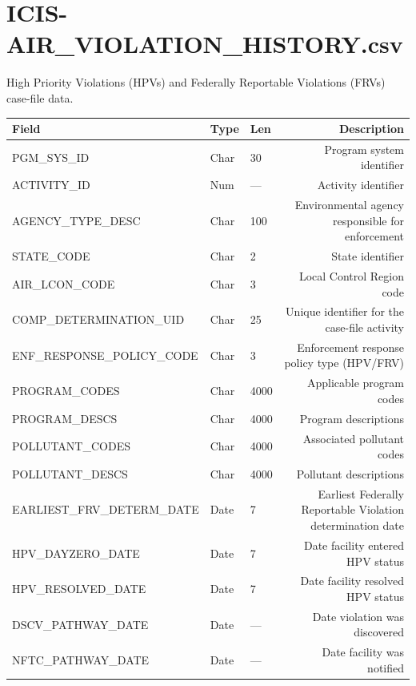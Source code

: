 \documentclass[11pt]{article}
\begin{document}
\section*{ICIS-AIR\_VIOLATION\_HISTORY.csv}
High Priority Violations (HPVs) and Federally Reportable Violations (FRVs) case-file data.
\begin{longtable}{F T L D}
\toprule
Field & Type & Len & Description \\ \midrule \endhead
PGM\_SYS\_ID & Char & 30 & Program system identifier \\
ACTIVITY\_ID & Num & --- & Activity identifier \\
AGENCY\_TYPE\_DESC & Char & 100 & Environmental agency responsible for enforcement \\
STATE\_CODE & Char & 2 & State identifier \\
AIR\_LCON\_CODE & Char & 3 & Local Control Region code \\
COMP\_DETERMINATION\_UID & Char & 25 & Unique identifier for the case-file activity \\
ENF\_RESPONSE\_POLICY\_CODE & Char & 3 & Enforcement response policy type (HPV/FRV) \\
PROGRAM\_CODES & Char & 4000 & Applicable program codes \\
PROGRAM\_DESCS & Char & 4000 & Program descriptions \\
POLLUTANT\_CODES & Char & 4000 & Associated pollutant codes \\
POLLUTANT\_DESCS & Char & 4000 & Pollutant descriptions \\
EARLIEST\_FRV\_DETERM\_DATE & Date & 7 & Earliest Federally Reportable Violation determination date \\
HPV\_DAYZERO\_DATE & Date & 7 & Date facility entered HPV status \\
HPV\_RESOLVED\_DATE & Date & 7 & Date facility resolved HPV status \\
DSCV\_PATHWAY\_DATE & Date & --- & Date violation was discovered \\
NFTC\_PATHWAY\_DATE & Date & --- & Date facility was notified \\
\bottomrule
\end{longtable}
\end{document}
